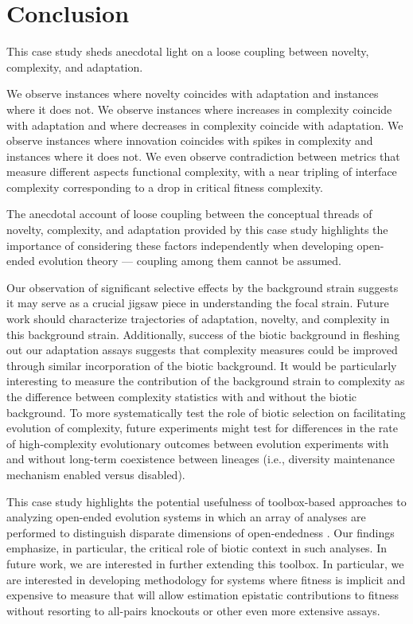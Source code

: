 \section{Conclusion}

This case study sheds anecdotal light on a loose coupling between novelty, complexity, and adaptation.

We observe instances where novelty coincides with adaptation and instances where it does not.
We observe instances where increases in complexity coincide with adaptation and where decreases in complexity coincide with adaptation.
We observe instances where innovation coincides with spikes in complexity and instances where it does not.
We even observe contradiction between metrics that measure different aspects functional complexity, with a near tripling of interface complexity corresponding to a drop in critical fitness complexity.

The anecdotal account of loose coupling between the conceptual threads of novelty, complexity, and adaptation provided by this case study highlights the importance of considering these factors independently when developing open-ended evolution theory --- coupling among them cannot be assumed.

Our observation of significant selective effects by the background strain suggests it may serve as a crucial jigsaw piece in understanding the focal strain.
Future work should characterize trajectories of adaptation, novelty, and complexity in this background strain.
Additionally, success of the biotic background in fleshing out our adaptation assays suggests that complexity measures could be improved through similar incorporation of the biotic background.
It would be particularly interesting to measure the contribution of the background strain to complexity as the difference between complexity statistics with and without the biotic background.
To more systematically test the role of biotic selection on facilitating evolution of complexity, future experiments might test for differences in the rate of high-complexity evolutionary outcomes between evolution experiments with and without long-term coexistence between lineages (i.e., diversity maintenance mechanism enabled versus disabled).

This case study highlights the potential usefulness of toolbox-based approaches to analyzing open-ended evolution systems in which an array of analyses are performed to distinguish disparate dimensions of open-endedness \citep{dolson2019modes}.
Our findings emphasize, in particular, the critical role of biotic context in such analyses.
In future work, we are interested in further extending this toolbox.
In particular, we are interested in developing methodology for systems where fitness is implicit and expensive to measure that will allow estimation epistatic contributions to fitness without resorting to all-pairs knockouts or other even more extensive assays.


